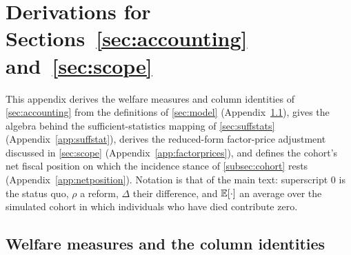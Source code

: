 \section{Derivations for Sections~\ref*{sec:accounting} and~\ref*{sec:scope}}\label{app:derivations}

This appendix derives the welfare measures and column identities of \autoref{sec:accounting} from the definitions of \autoref{sec:model} (Appendix~\ref{app:welfare}), gives the algebra behind the sufficient-statistics mapping of \autoref{sec:suffstats} (Appendix~\ref{app:suffstat}), derives the reduced-form factor-price adjustment discussed in \autoref{sec:scope} (Appendix~\ref{app:factorprices}), and defines the cohort's net fiscal position on which the incidence stance of \autoref{subsec:cohort} rests (Appendix~\ref{app:netposition}). Notation is that of the main text: superscript $0$ is the status quo, $\rho$ a reform, $\Delta$ their difference, and ${\mathbb E}[\cdot]$ an average over the simulated cohort in which individuals who have died contribute zero.

\subsection{Welfare measures and the column identities}\label{app:welfare}

